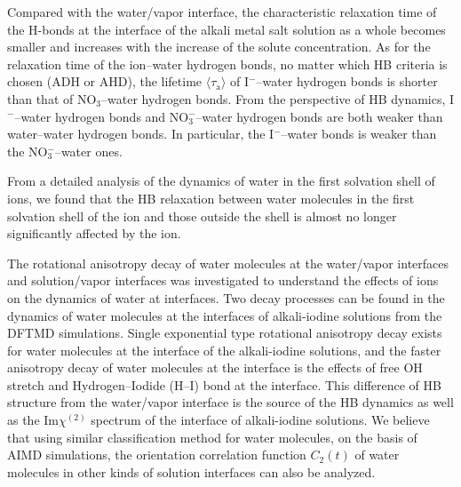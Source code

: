 Compared with the water/vapor interface, the characteristic relaxation time of the H-bonds 
at the interface of the alkali metal salt solution as a whole becomes smaller and increases with the increase of the solute concentration.
As for the relaxation time of the ion--water hydrogen bonds, no matter which HB criteria is chosen (ADH or AHD), 
the lifetime $\langle\tau_\text{a}\rangle$ of I$^-$--water hydrogen bonds is shorter than that of NO$_3$--water hydrogen bonds.
From the perspective of HB dynamics, I$^-$--water hydrogen bonds and NO$_3^-$--water hydrogen bonds are both weaker than water--water hydrogen bonds. 
In particular, the I$^-$--water bonds is weaker than the NO$_3^-$--water ones.

From a detailed analysis of the dynamics of water in the first solvation shell of ions, we found that the HB relaxation between water molecules in the first solvation shell of the ion and those outside the shell is almost
no longer significantly affected by the ion.

The rotational anisotropy decay of water molecules at the water/vapor interfaces and solution/vapor interfaces was investigated to
understand the effects of ions on the dynamics of water at interfaces.
 Two decay processes can be found in the dynamics of water molecules 
at the interfaces of alkali-iodine solutions from the DFTMD simulations.
Single exponential type rotational anisotropy decay exists for water molecules at the interface of the alkali-iodine solutions,
and the faster anisotropy decay of water molecules at the interface is the effects of free OH stretch and Hydrogen--Iodide (H--I) bond at the interface.
This difference of HB structure from the water/vapor interface is the source of 
the HB dynamics as well as the Im$\chi^{(2)}$ spectrum of the interface of alkali-iodine solutions.  
We believe that using similar classification method for water molecules, on the basis of AIMD simulations, 
the orientation correlation function $C_2(t)$ of water molecules in other kinds of solution interfaces can also be analyzed.

